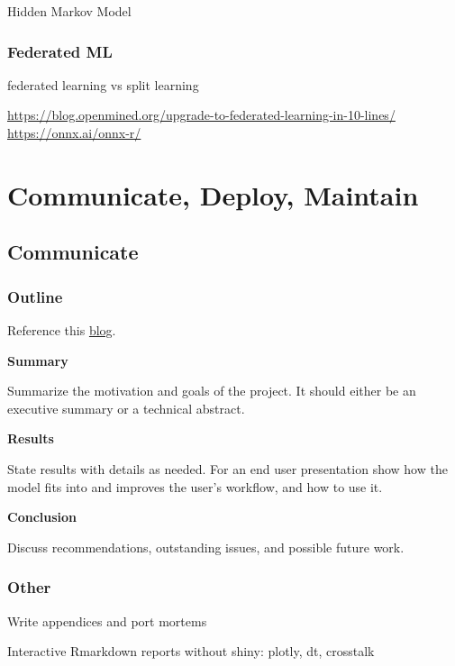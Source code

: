 \documentclass[]{book}
\begin{document}
Hidden Markov Model

\hypertarget{federated-ml}{%
\subsection{Federated ML}\label{federated-ml}}

federated learning vs split learning

\url{https://blog.openmined.org/upgrade-to-federated-learning-in-10-lines/} \url{https://onnx.ai/onnx-r/}

\hypertarget{communicate-deploy-maintain}{%
\chapter{Communicate, Deploy, Maintain}\label{communicate-deploy-maintain}}

\hypertarget{communicate}{%
\section{Communicate}\label{communicate}}

\hypertarget{outline}{%
\subsection{Outline}\label{outline}}

Reference this \href{https://www.dataquest.io/blog/data-science-project-style-guide/}{blog}.

\textbf{Summary}

Summarize the motivation and goals of the project. It should either be an executive summary or a technical abstract.

\textbf{Results}

State results with details as needed. For an end user presentation show how the model fits into and improves the user's workflow, and how to use it.

\textbf{Conclusion}

Discuss recommendations, outstanding issues, and possible future work.

\hypertarget{other}{%
\subsection{Other}\label{other}}

Write appendices and port mortems

Interactive Rmarkdown reports without shiny: plotly, dt, crosstalk
\end{document}
